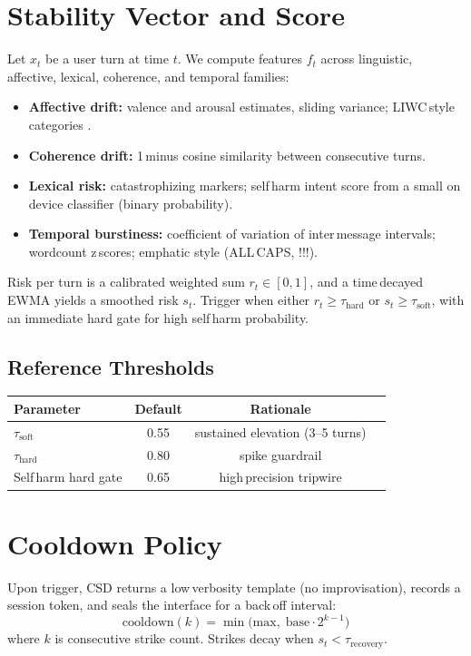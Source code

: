 \documentclass[11pt]{article}
\begin{document}
\section{Stability Vector and Score}
Let \(x_t\) be a user turn at time \(t\). We compute features \(f_t\) across linguistic, affective, lexical, coherence, and temporal families:
\begin{itemize}[leftmargin=1.2em]
  \item \textbf{Affective drift:} valence and arousal estimates, sliding variance; LIWC\,style categories \parencite{Warriner2013}.
  \item \textbf{Coherence drift:} 1\,minus cosine similarity between consecutive turns.
  \item \textbf{Lexical risk:} catastrophizing markers; self\,harm intent score from a small on\,device classifier (binary probability).
  \item \textbf{Temporal burstiness:} coefficient of variation of inter\,message intervals; wordcount z\,scores; emphatic style (ALL\,CAPS, !!!).
\end{itemize}
Risk per turn is a calibrated weighted sum \(r_t \in [0,1]\), and a time\,decayed EWMA yields a smoothed risk \(s_t\). Trigger when either \(r_t \ge \tau_{\text{hard}}\) or \(s_t \ge \tau_{\text{soft}}\), with an immediate hard gate for high self\,harm probability.

\subsection{Reference Thresholds}
\begin{center}
\begin{tabular}{lccc}
\toprule
Parameter & Default & Rationale \\
\midrule
\(\tau_{\text{soft}}\) & 0.55 & sustained elevation (3--5 turns) \\
\(\tau_{\text{hard}}\) & 0.80 & spike guardrail \\
Self\,harm hard gate & 0.65 & high\,precision tripwire \\
\bottomrule
\end{tabular}
\end{center}

\section{Cooldown Policy}
Upon trigger, CSD returns a low\,verbosity template (no improvisation), records a session token, and seals the interface for a back\,off interval:
\[ \text{cooldown}(k) = \min\big(\text{max},\; \text{base}\cdot 2^{k-1}\big) \]
where \(k\) is consecutive strike count. Strikes decay when \(s_t < \tau_{\text{recovery}}\).
\end{document}
